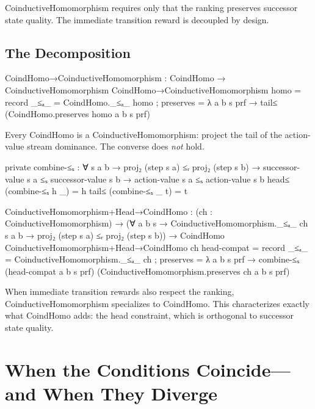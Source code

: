 \documentclass[9pt,a4paper]{article}
\theoremstyle{plain}
\theoremstyle{definition}
\theoremstyle{remark}
\begin{document}
\noindent CoinductiveHomomorphism requires only that the ranking preserves successor state quality.  The immediate transition reward is decoupled by design.

\subsection{The Decomposition}

\begin{code}
  CoindHomo→CoinductiveHomomorphism : CoindHomo → CoinductiveHomomorphism
  CoindHomo→CoinductiveHomomorphism homo = record
    { _≤ₐ_ = CoindHomo._≤ₐ_ homo
    ; preserves = λ a b s prf → tail≤ (CoindHomo.preserves homo a b s prf)
    }
\end{code}

\noindent Every CoindHomo is a CoinductiveHomomorphism: project the tail of the action-value stream dominance.  The converse does \emph{not} hold.

\begin{code}[hide]
  private
    combine-≤ₛ : ∀ {s a b} →
      proj₂ (step s a) ≤ᵣ proj₂ (step s b) →
      successor-value s a ≤ₛ successor-value s b →
      action-value s a ≤ₛ action-value s b
    head≤ (combine-≤ₛ h _) = h
    tail≤ (combine-≤ₛ _ t) = t
\end{code}

\begin{code}
  CoinductiveHomomorphism+Head→CoindHomo :
    (ch : CoinductiveHomomorphism) →
    (∀ a b s → CoinductiveHomomorphism._≤ₐ_ ch s a b →
      proj₂ (step s a) ≤ᵣ proj₂ (step s b)) →
    CoindHomo
  CoinductiveHomomorphism+Head→CoindHomo ch head-compat = record
    { _≤ₐ_ = CoinductiveHomomorphism._≤ₐ_ ch
    ; preserves = λ a b s prf →
        combine-≤ₛ (head-compat a b s prf)
                   (CoinductiveHomomorphism.preserves ch a b s prf)
    }
\end{code}

\noindent When immediate transition rewards also respect the ranking, CoinductiveHomomorphism specializes to CoindHomo.  This characterizes exactly what CoindHomo adds: the head constraint, which is orthogonal to successor state quality.


\section{When the Conditions Coincide---and When They Diverge}\label{sec:landscape}
\end{document}
